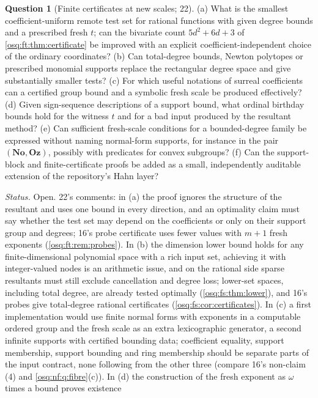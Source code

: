 \documentclass[11pt,letterpaper]{article}
\numberwithin{equation}{section}
\theoremstyle{definition}
\newtheorem{question}[question]{Question}
\theoremstyle{remark}
\theoremstyle{plain}
\newcommand{\No}{\mathbf{No}}
\newcommand{\Oz}{\mathbf{Oz}}
\begin{document}
\begin{question}[Finite certificates at new scales; 22]\label{osq:ft:q:certificates}
(a) What is the smallest coefficient-uniform remote test set for rational functions with given degree bounds and a prescribed fresh $t$; can the
bivariate count $5d^2+6d+3$ of \cref{osq:ft:thm:certificate} be improved with an explicit coefficient-independent choice of the ordinary coordinates?
(b) Can total-degree bounds, Newton polytopes or prescribed monomial supports replace the rectangular degree space and give substantially smaller
tests? (c) For which useful notations of surreal coefficients can a certified group bound and a symbolic fresh scale be produced effectively?
(d) Given sign-sequence descriptions of a support bound, what ordinal birthday bounds hold for the witness $t$ and for a bad input produced by the
resultant method? (e) Can sufficient fresh-scale conditions for a bounded-degree family be expressed without naming normal-form supports, for instance
in the pair $(\No,\Oz)$, possibly with predicates for convex subgroups? (f) Can the support-block and finite-certificate proofs be added as a small,
independently auditable extension of the repository's Hahn layer?
\end{question}
\emph{Status.} Open. 22's comments: in (a) the proof ignores the structure of the resultant and uses one bound in every direction, and an optimality
claim must say whether the test set may depend on the coefficients or only on their support group and degrees; 16's probe certificate uses fewer values
with $m+1$ fresh exponents (\cref{osq:ft:rem:probes}). In (b) the dimension lower bound holds for any finite-dimensional polynomial space with a rich
input set, achieving it with integer-valued nodes is an arithmetic issue, and on the rational side sparse resultants must still exclude cancellation and
degree loss; lower-set spaces, including total degree, are already tested optimally (\cref{osq:fs:thm:lower}), and 16's probes give total-degree
rational certificates (\cref{osq:fs:cor:certificates}). In (c) a first implementation would use finite normal forms with exponents in a computable
ordered group and the fresh scale as an extra lexicographic generator, a second infinite supports with certified bounding data; coefficient equality,
support membership, support bounding and ring membership should be separate parts of the input contract, none following from the other three
(compare 16's non-claim (4) and \cref{osq:nf:q:fibre}(c)). In (d) the construction of the fresh exponent as $\omega$ times a bound proves existence
\end{document}
